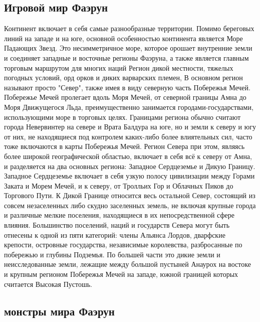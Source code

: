 \subsection{Игровой мир Фаэрун}
Континент включает в себя самые разнообразные территории. Помимо береговых линий на западе и на юге, основной особенностью континента является Море Падающих Звезд. Это несимметричное море, которое орошает внутренние земли и соединяет западные и восточные регионы Фаэруна, а также является главным торговым маршрутом для многих наций
Регион дикой местности, тяжелых погодных условий, орд орков и диких варварских племен, В основном регион называют просто "Север", также имея в виду северную часть Побережья Мечей. Побережье Мечей пролегает вдоль Моря Мечей, от северной границы Амна до Моря Движущегося Льда, преимущественно занимается городами-государствами, использующими море в торговых целях. Границами региона обычно считают города Невервинтер на севере и Врата Балдура на юге, но и земли к северу и югу от них, не находящиеся под контролем каких-либо более влиятельных сил, часто тоже включаются в карты Побережья Мечей. Регион Севера при этом, являясь более широкой географической областью, включает в себя всё к северу от Амна, и разделяется на два основных региона: Западное Сердцеземье и Дикую Границу. Западное Сердцеземье включает в себя узкую полосу цивилизации между Горами Заката и Морем Мечей, и к северу, от Тролльих Гор и Облачных Пиков до Торгового Пути. К Дикой Границе относится весь остальной Север, состоящий из совсем незаселенных либо скудно заселенных земель, не включая крупные города и различные мелкие поселения, находящиеся в их непосредственной сфере влияния. Большинство поселений, наций и государств Севера могут быть отнесены к одной из пяти категорий: члены Альянса Лордов, дварфские крепости, островные государства, независимые королевства, разбросанные по побережью и глубины Подземья. По большей части это дикие земли и неисследованные земли, лежащие между большой пустыней Анаурох на востоке и крупным регионом Побережья Мечей на западе, южной границей которых считается Высокая Пустошь.

\subsection{монстры мира Фаэрун}

